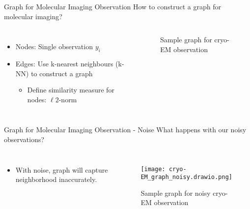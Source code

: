 \begin{frame}{Graph for Molecular Imaging Observation}
  How to construct a graph for molecular imaging?
  \pause
  \begin{columns}
    \begin{itemize}
      \item Nodes: Single observation $y_i$
      \item<3-> Edges: Use k-nearest neighbours (k-NN) to construct a graph
      \begin{itemize}
        \item<4-> Define similarity measure for nodes: $\ell2$-norm
      \end{itemize}
    \end{itemize}

    \begin{figure}
      \centering




      \caption{Sample graph for cryo-EM observation}        
    \end{figure}
  \end{columns}
\end{frame}

\begin{frame}{Graph for Molecular Imaging Observation - Noise}
  What happens with our noisy observations?
  \pause
  \begin{columns}
    \begin{itemize}
      \item With noise, graph will capture neighborhood inaccurately.
    \end{itemize}

    \begin{figure}
      \centering
      \texttt{[image: cryo-EM\_graph\_noisy.drawio.png]}
      \caption{Sample graph for noisy cryo-EM observation}        
    \end{figure}
  \end{columns}
\end{frame}


